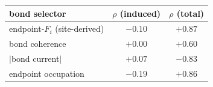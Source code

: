 \begin{tabular}{lcc}
\toprule
bond selector & $\rho$ (induced) & $\rho$ (total) \\
\midrule
endpoint-$F_i$ (site-derived) & $-0.10$ & $+0.87$ \\
bond coherence & $+0.00$ & $+0.60$ \\
$|$bond current$|$ & $+0.07$ & $-0.83$ \\
endpoint occupation & $-0.19$ & $+0.86$ \\
\bottomrule
\end{tabular}

